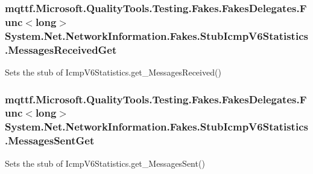 \hypertarget{class_system_1_1_net_1_1_network_information_1_1_fakes_1_1_stub_icmp_v6_statistics_afe82bb644005f43a39cef770ea74c992}{
\subsubsection[{Messages\-Received\-Get}]{\setlength{\rightskip}{0pt plus 5cm}mqttf.\-Microsoft.\-Quality\-Tools.\-Testing.\-Fakes.\-Fakes\-Delegates.\-Func$<$long$>$ System.\-Net.\-Network\-Information.\-Fakes.\-Stub\-Icmp\-V6\-Statistics.\-Messages\-Received\-Get}}\label{class_system_1_1_net_1_1_network_information_1_1_fakes_1_1_stub_icmp_v6_statistics_afe82bb644005f43a39cef770ea74c992}


Sets the stub of Icmp\-V6\-Statistics.\-get\-\_\-\-Messages\-Received()

\hypertarget{class_system_1_1_net_1_1_network_information_1_1_fakes_1_1_stub_icmp_v6_statistics_a6de5f3686c488b49e6754fc7da0f5153}{
\subsubsection[{Messages\-Sent\-Get}]{\setlength{\rightskip}{0pt plus 5cm}mqttf.\-Microsoft.\-Quality\-Tools.\-Testing.\-Fakes.\-Fakes\-Delegates.\-Func$<$long$>$ System.\-Net.\-Network\-Information.\-Fakes.\-Stub\-Icmp\-V6\-Statistics.\-Messages\-Sent\-Get}}\label{class_system_1_1_net_1_1_network_information_1_1_fakes_1_1_stub_icmp_v6_statistics_a6de5f3686c488b49e6754fc7da0f5153}


Sets the stub of Icmp\-V6\-Statistics.\-get\-\_\-\-Messages\-Sent()

